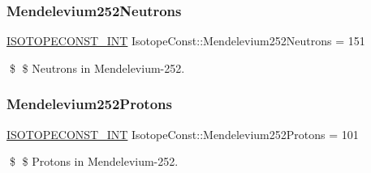 \subsubsection{\texorpdfstring{Mendelevium252\+Neutrons}{Mendelevium252Neutrons}}
{\footnotesize\ttfamily \mbox{\hyperlink{group___isotope_const-_macros_ga5f18360b3e99483a35c32d789e62621c}{I\+S\+O\+T\+O\+P\+E\+C\+O\+N\+S\+T\+\_\+\+I\+NT}} Isotope\+Const\+::\+Mendelevium252\+Neutrons = 151}

\$ \$ Neutrons in Mendelevium-\/252. \mbox{\label{group___isotope_const-_mendelevium-_md252_ga347c0ca5c74e95741dabaa94b736e6c4}} 
\subsubsection{\texorpdfstring{Mendelevium252\+Protons}{Mendelevium252Protons}}
{\footnotesize\ttfamily \mbox{\hyperlink{group___isotope_const-_macros_ga5f18360b3e99483a35c32d789e62621c}{I\+S\+O\+T\+O\+P\+E\+C\+O\+N\+S\+T\+\_\+\+I\+NT}} Isotope\+Const\+::\+Mendelevium252\+Protons = 101}

\$ \$ Protons in Mendelevium-\/252. 